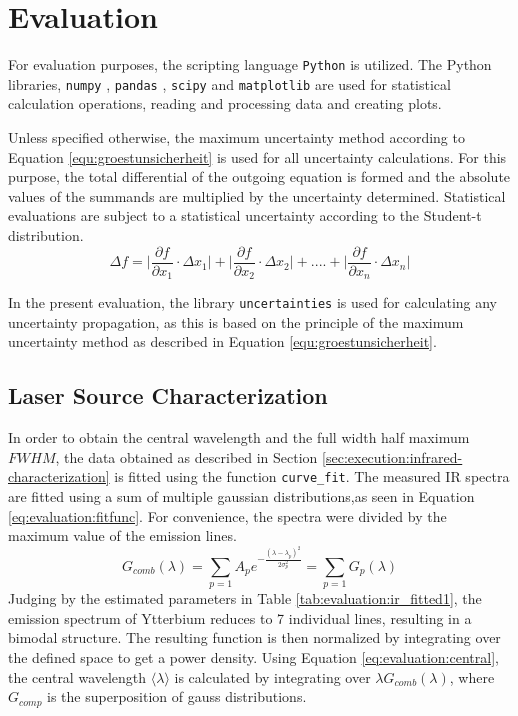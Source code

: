 \section{Evaluation}
\label{sec:evaluation}

For evaluation purposes, the scripting language \verb|Python| \cite{PYTHON} is utilized.
The Python libraries, \verb|numpy| \cite{harris2020array}, \verb|pandas| \cite{reback2020pandas}, \verb|scipy| \cite{2020SciPy-NMeth} and \verb|matplotlib| \cite{Hunter:2007} are used for statistical calculation operations, reading and processing data and creating plots.

Unless specified otherwise, the maximum uncertainty method according to Equation \ref{equ:groestunsicherheit} \cite{MMETH} is used for all uncertainty calculations.
For this purpose, the total differential of the outgoing equation is formed and the absolute values of the summands are multiplied by the uncertainty determined.
Statistical evaluations are subject to a statistical uncertainty according to the Student-t distribution.
\begin{equation}
    \varDelta f = \biggl| \frac{\partial f}{\partial x_{1}} \cdot \varDelta x_{1} \biggl| + \biggl| \frac{\partial f}{\partial x_{2}} \cdot \varDelta x_{2} \biggl| + .... + \biggl| \frac{\partial f}{\partial x_{n}} \cdot \varDelta x_{n} \biggl|
    \label{equ:groestunsicherheit}
\end{equation}

In the present evaluation, the library \verb|uncertainties| \cite{UN} is used for calculating any uncertainty propagation, as this is based on the principle of the maximum uncertainty method as described in Equation \ref{equ:groestunsicherheit}.

\subsection{Laser Source Characterization}
In order to obtain the central wavelength and the full width half maximum $FWHM$, the data obtained as described in Section \ref{sec:execution:infrared-characterization} is fitted using the function \verb|curve_fit|.
The measured IR spectra are fitted using a sum of multiple gaussian distributions,as seen in Equation \ref{eq:evaluation:fitfunc}.
For convenience, the spectra were divided by the maximum value of the emission lines. 
\begin{equation}
    G_{comb}(\lambda) = \sum_{p = 1} A_p e^{-\frac{(\lambda - \lambda_p)^{2}}{2 \sigma_{p}^2}}  = \sum_{p = 1} G_p(\lambda)
    \label{eq:evaluation:fitfunc}
\end{equation}
Judging by the estimated parameters in Table \ref{tab:evaluation:ir_fitted1}, the emission spectrum of Ytterbium reduces to 7 individual lines, resulting in a bimodal structure.
The resulting function is then normalized by integrating over the defined space to get a power density.
Using Equation \ref{eq:evaluation:central}, the central wavelength $\langle \lambda \rangle$ is calculated by integrating over $\lambda G_{comb}(\lambda)$, where $G_{comp}$ is the superposition of gauss distributions. 

